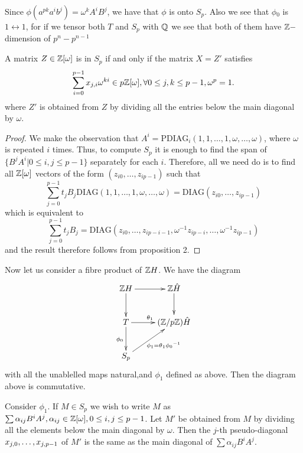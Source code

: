 \documentclass[11pt]{report}
\begin{document}
Since $\phi{}(a^{pk}a^ib^j) = \omega{}^kA^iB^j$, we have that $\phi{}$ is onto $S_p$. 
Also we see that $\phi{}_0$ is $1\leftrightarrow{}1$, for if we tensor
both $T$ and $S_p$ with $\rat{}$ we see that both of them have $\integers{}-$dimension
 of $p^n-p^{n-1}$

\begin{proposition}
A matrix $Z \in{} \integers{}[\omega{}]$ is in $S_p$ if and only if the matrix $X = Z'$ satisfies
\begin{equation}
\sum_{i=0}^{p-1} x_{j,i}\omega{}^{ki} \in{} p\iom, 
\forall 0\leq{}j,k\leq{}p-1, \omega^p = 1.
\label{eqn:spcondition}\\
\end{equation}
where $Z'$ is obtained from $Z$ by dividing all the entries below the main diagonal by $\omega{}$.
\end{proposition}
\begin{proof}

We make the observation that $A^i = \mathrm{PDIAG}_i(1,1,\ldots,1,\omega,\ldots,\omega)$, 
where $\omega$ is repeated $i$ times. Thus, to compute $S_p$ it is enough to
find the span of $\{B^jA^i \vert 0\leq{}i,j\leq{}p-1\}$ separately for each $i$. 
Therefore, all we need do is to find all $\integers{}[\omega]$ vectors of the form 
$(z_{i0},\ldots,z_{ip-1})$ such that
\[\sum_{j=0}^{p-1} t_jB_j\mathrm{DIAG}(1,1,\ldots,1,\omega,\ldots,\omega) = \mathrm{DIAG}(z_{i0},\ldots,z_{ip-1})\]
which is equivalent to
\[\sum_{j=0}^{p-1} t_jB_j = \mathrm{DIAG}(z_{i0},\ldots,z_{ip-i-1},\omega^{-1}z_{ip-i},\ldots,\omega^{-1}z_{ip-1})\]
and the result therefore follows from proposition 2.
\end{proof}

Now let us consider a fibre product of $\integers{}H$. We have the diagram
\[
\xymatrix {
\integers{}H \ar[r] \ar[d] 
&\integers\hat{H} \ar[d]\\
T \ar[r]^{\theta{}_1} \ar[d]_{\phi{}_0} 
&(\integers/p\integers)\hat{H}\\
S_p \ar[ur]_{\phi{}_1 = \theta{}_1{\phi{}_0}^{-1}}&
}\]
with all the unablelled maps natural,and $\phi_1$ defined as above. Then the diagram above is
commutative.

Consider $\phi_1$. If $M \in S_p$ we wish to write $M$ as $\sum\alpha_{ij}B^iA^j, 
\alpha_{ij}\in\integers{}[\omega], 0 \le i,j \le p-1$. Let $M'$
be obtained from $M$
by dividing all the elements below the main diagonal by $\omega$.  Then the $j$-th pseudo-diagonal 
$\series[x]{j,0}{j,p-1}$ of $M'$ is the same as the main diagonal of $\sum\alpha_{ij}B^iA^j$.
\end{document}
